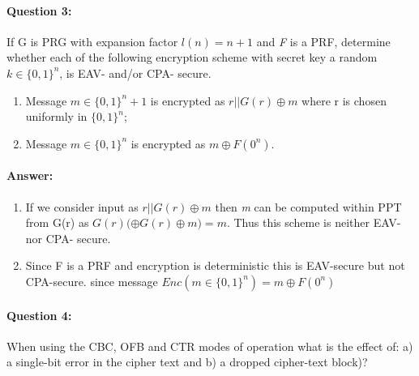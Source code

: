 \documentclass{article}
\begin{document}
    \paragraph{Question 3:} If G is PRG with expansion factor $l(n)=n+1$ and \emph{F} is a PRF, determine whether each of the following encryption scheme with secret key a random $k \in {\{0,1\}}^n$, is EAV- and/or CPA- secure. 
    \begin{enumerate}
        \item Message $m \in {\{0,1\}}^n+1$ is encrypted as $r||G(r)\oplus{m}$ where r is chosen uniformly in ${\{0,1\}}^n$;
        \item Message $m \in {\{0,1\}}^n$ is encrypted as $m\oplus{F(0^n)}$.
    \end{enumerate}    
    \paragraph{Answer: \newline}
        \begin{enumerate}
            \item If we consider input as $r||G(r)\oplus{m}$ then \emph{m} can be computed within PPT from G(r) as $G(r)(\oplus{G(r) \oplus{m})} = m$.\newline
            Thus this scheme is neither EAV- nor CPA- secure.
            \item Since F is a PRF and encryption is deterministic this is EAV-secure but not CPA-secure. since message $Enc(m \in {\{0,1\}}^n) = m \oplus{F(0^n)}$
        \end{enumerate}
    
    \paragraph{Question 4:} When using the CBC, OFB and CTR modes of operation what is the effect of: a) a single-bit error in the cipher text and b) a dropped cipher-text block)?
\end{document}

